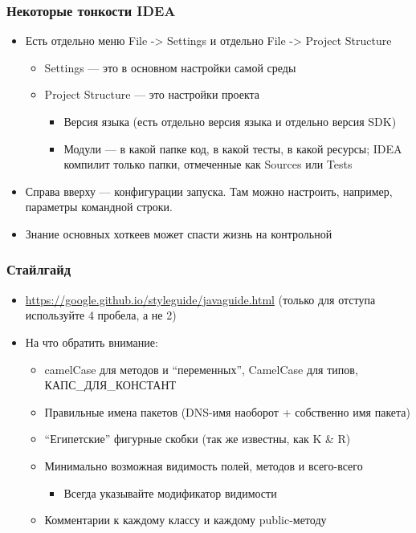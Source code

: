 \documentclass[xetex,mathserif,serif]{beamer}
\begin{document}
	\begin{frame}
		\frametitle{Некоторые тонкости IDEA}
		\begin{itemize}
			\item Есть отдельно меню File -> Settings и отдельно File -> Project Structure
			\begin{itemize}
				\item Settings --- это в основном настройки самой среды
				\item Project Structure --- это настройки проекта
				\begin{itemize}
					\item Версия языка (есть отдельно версия языка и отдельно версия SDK)
					\item Модули --- в какой папке код, в какой тесты, в какой ресурсы; IDEA компилит только папки, отмеченные как Sources или Tests
				\end{itemize}
			\end{itemize}
			\item Справа вверху --- конфигурации запуска. Там можно настроить, например, параметры командной строки.
			\item Знание основных хоткеев может спасти жизнь на контрольной
		\end{itemize}
	\end{frame}

	\begin{frame}
		\frametitle{Стайлгайд}
		\begin{itemize}
			\item \url{https://google.github.io/styleguide/javaguide.html} (только для отступа используйте 4 пробела, а не 2)
			\item На что обратить внимание:
			\begin{itemize}
				\item camelCase для методов и ``переменных'', CamelCase для типов, КАПС\_ДЛЯ\_КОНСТАНТ
				\item Правильные имена пакетов (DNS-имя наоборот + собственно имя пакета)
				\item ``Египетские'' фигурные скобки (так же известны, как K \& R)
				\item Минимально возможная видимость полей, методов и всего-всего
				\begin{itemize}
					\item Всегда указывайте модификатор видимости
				\end{itemize}
				\item Комментарии к каждому классу и каждому public-методу
			\end{itemize}
		\end{itemize}
	\end{frame}
\end{document}
